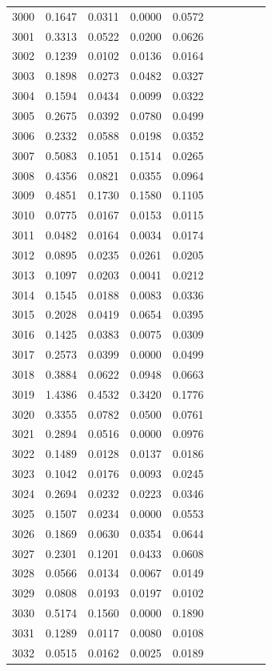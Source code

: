 \begin{table}
\begin{tabular}{cccccccccc}
3000& 0.1647& 0.0311& 0.0000& 0.0572\\ 
3001& 0.3313& 0.0522& 0.0200& 0.0626\\ 
3002& 0.1239& 0.0102& 0.0136& 0.0164\\ 
3003& 0.1898& 0.0273& 0.0482& 0.0327\\ 
3004& 0.1594& 0.0434& 0.0099& 0.0322\\ 
3005& 0.2675& 0.0392& 0.0780& 0.0499\\ 
3006& 0.2332& 0.0588& 0.0198& 0.0352\\ 
3007& 0.5083& 0.1051& 0.1514& 0.0265\\ 
3008& 0.4356& 0.0821& 0.0355& 0.0964\\ 
3009& 0.4851& 0.1730& 0.1580& 0.1105\\ 
3010& 0.0775& 0.0167& 0.0153& 0.0115\\ 
3011& 0.0482& 0.0164& 0.0034& 0.0174\\ 
3012& 0.0895& 0.0235& 0.0261& 0.0205\\ 
3013& 0.1097& 0.0203& 0.0041& 0.0212\\ 
3014& 0.1545& 0.0188& 0.0083& 0.0336\\ 
3015& 0.2028& 0.0419& 0.0654& 0.0395\\ 
3016& 0.1425& 0.0383& 0.0075& 0.0309\\ 
3017& 0.2573& 0.0399& 0.0000& 0.0499\\ 
3018& 0.3884& 0.0622& 0.0948& 0.0663\\ 
3019& 1.4386& 0.4532& 0.3420& 0.1776\\ 
3020& 0.3355& 0.0782& 0.0500& 0.0761\\ 
3021& 0.2894& 0.0516& 0.0000& 0.0976\\ 
3022& 0.1489& 0.0128& 0.0137& 0.0186\\ 
3023& 0.1042& 0.0176& 0.0093& 0.0245\\ 
3024& 0.2694& 0.0232& 0.0223& 0.0346\\ 
3025& 0.1507& 0.0234& 0.0000& 0.0553\\ 
3026& 0.1869& 0.0630& 0.0354& 0.0644\\ 
3027& 0.2301& 0.1201& 0.0433& 0.0608\\ 
3028& 0.0566& 0.0134& 0.0067& 0.0149\\ 
3029& 0.0808& 0.0193& 0.0197& 0.0102\\ 
3030& 0.5174& 0.1560& 0.0000& 0.1890\\ 
3031& 0.1289& 0.0117& 0.0080& 0.0108\\ 
3032& 0.0515& 0.0162& 0.0025& 0.0189\\ 

\end{tabular}
\end{table}
